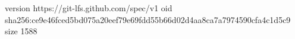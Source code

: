 version https://git-lfs.github.com/spec/v1
oid sha256:ce9e46fced5bd075a20eef79e69fdd55b66d02d4aa8ca7a7974590cfa4c1d5c9
size 1588
